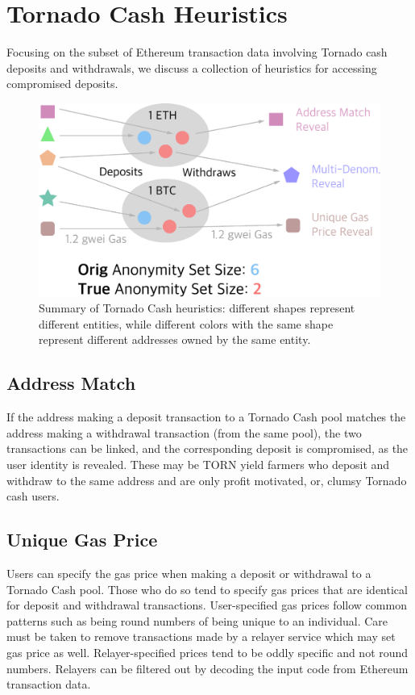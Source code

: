 \documentclass[11pt,a4paper]{article}
\begin{document}
\section{Tornado Cash Heuristics}
\label{sec:tornado}

Focusing on the subset of Ethereum transaction data involving Tornado cash deposits and withdrawals, we discuss a collection of heuristics for accessing compromised deposits.

\begin{figure}[b!]
\includegraphics[width=\linewidth]{figures/tornado.pdf}
\caption{Summary of Tornado Cash heuristics: different shapes represent different entities, while different colors with the same shape represent different addresses owned by the same entity.}
\label{fig:tornado}
\end{figure}

\subsection{Address Match}

If the address making a deposit transaction to a Tornado Cash pool matches the address making a withdrawal transaction (from the same pool), the two transactions can be linked, and the corresponding deposit is compromised, as the user identity is revealed. These may be TORN yield farmers who deposit and withdraw to the same address and are only profit motivated, or, clumsy Tornado cash users.

\subsection{Unique Gas Price}

Users can specify the gas price when making a deposit or withdrawal to a Tornado Cash pool. Those who do so tend to specify gas prices that are identical for deposit and withdrawal transactions. User-specified gas prices follow common patterns such as being round numbers of being unique to an individual. Care must be taken to remove transactions made by a relayer service which may set gas price as well. Relayer-specified prices tend to be oddly specific and not round numbers. Relayers can be filtered out by decoding the input code from Ethereum transaction data.
\end{document}

